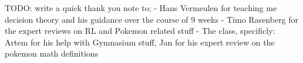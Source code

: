TODO: write a quick thank you note to;
- Hans Vermeulen for teaching me decision theory and his guidance over the course of 9 weeks
- Timo Rasenberg for the expert reviews on RL and Pokemon related stuff
- The class, specificly: Artem for his help with Gymnasium stuff, Jan for his expert review on the pokemon math definitions
